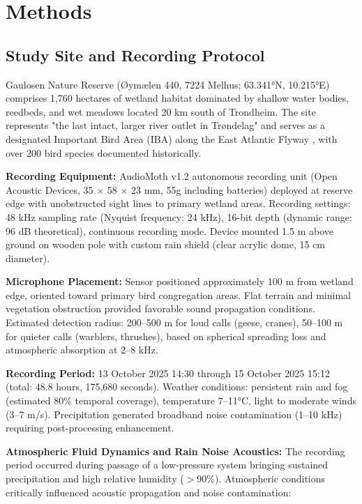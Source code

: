 \documentclass[twocolumn]{article}
\begin{document}
\section{Methods}

\subsection{Study Site and Recording Protocol}

Gaulosen Nature Reserve (Øymælen 440, 7224 Melhus; 63.341°N, 10.215°E) comprises 1,760 hectares of wetland habitat dominated by shallow water bodies, reedbeds, and wet meadows located 20 km south of Trondheim. The site represents "the last intact, larger river outlet in Trøndelag" and serves as a designated Important Bird Area (IBA) along the East Atlantic Flyway \citep{BirdLife2024}, with over 200 bird species documented historically.

\textbf{Recording Equipment:} AudioMoth v1.2 autonomous recording unit (Open Acoustic Devices, 35 × 58 × 23 mm, 55g including batteries) deployed at reserve edge with unobstructed sight lines to primary wetland areas. Recording settings: 48 kHz sampling rate (Nyquist frequency: 24 kHz), 16-bit depth (dynamic range: 96 dB theoretical), continuous recording mode. Device mounted 1.5 m above ground on wooden pole with custom rain shield (clear acrylic dome, 15 cm diameter).

\textbf{Microphone Placement:} Sensor positioned approximately 100 m from wetland edge, oriented toward primary bird congregation areas. Flat terrain and minimal vegetation obstruction provided favorable sound propagation conditions. Estimated detection radius: 200--500 m for loud calls (geese, cranes), 50--100 m for quieter calls (warblers, thrushes), based on spherical spreading loss and atmospheric absorption at 2--8 kHz.

\textbf{Recording Period:} 13 October 2025 14:30 through 15 October 2025 15:12 (total: 48.8 hours, 175,680 seconds). Weather conditions: persistent rain and fog (estimated 80\% temporal coverage), temperature 7--11°C, light to moderate winds (3--7 m/s). Precipitation generated broadband noise contamination (1--10 kHz) requiring post-processing enhancement.

\textbf{Atmospheric Fluid Dynamics and Rain Noise Acoustics:} The recording period occurred during passage of a low-pressure system bringing sustained precipitation and high relative humidity ($>$90\%). Atmospheric conditions critically influenced acoustic propagation and noise contamination:
\end{document}

